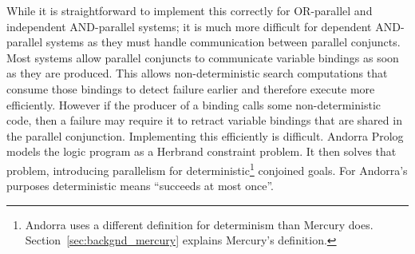 While it is straightforward to implement this correctly for OR-parallel
and independent AND-parallel systems;
it is much more difficult for dependent AND-parallel systems as
they must handle communication between parallel conjuncts.
Most systems allow parallel conjuncts to communicate variable bindings as
soon as they are produced.
This allows non-deterministic search computations that consume those bindings to
detect failure earlier and therefore execute more efficiently.
However if the producer of a binding calls some non-deterministic code,
then a failure may require it to retract variable bindings that are shared
in the parallel conjunction.
Implementing this efficiently is difficult.
Andorra Prolog \citep*{haridi:1990:andorra} models the
logic program as a Herbrand constraint problem.
It then solves that problem, introducing parallelism for
deterministic\footnote{
    Andorra uses a different definition for determinism than Mercury does.
    Section~\ref{sec:backgnd_mercury} explains Mercury's definition.}
conjoined goals.
For Andorra's purposes deterministic means ``succeeds at most once''.

